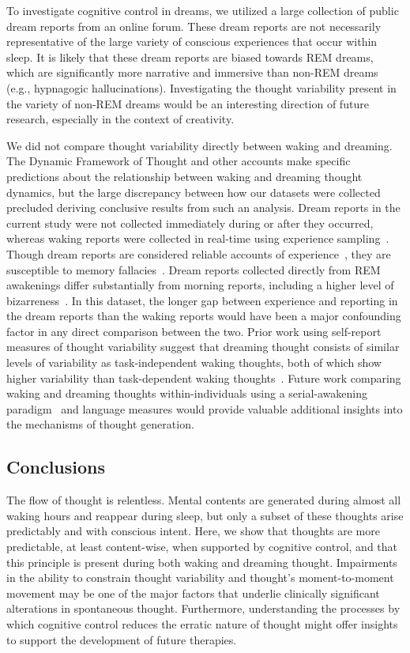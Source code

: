 \documentclass[10pt,a4paper,twocolumn]{article}
\begin{document}
\par
To investigate cognitive control in dreams, we utilized a large collection of public dream reports from an online forum. These dream reports are not necessarily representative of the large variety of conscious experiences that occur within sleep. It is likely that these dream reports are biased towards REM dreams, which are significantly more narrative and immersive than non-REM dreams (e.g., hypnagogic hallucinations). Investigating the thought variability present in the variety of non-REM dreams would be an interesting direction of future research, especially in the context of creativity.

\par
We did not compare thought variability directly between waking and dreaming. The Dynamic Framework of Thought and other accounts make specific predictions about the relationship between waking and dreaming thought dynamics, but the large discrepancy between how our datasets were collected precluded deriving conclusive results from such an analysis. Dream reports in the current study were not collected immediately during or after they occurred, whereas waking reports were collected in real-time using experience sampling~\cite{shiffman2008}. Though dream reports are considered reliable accounts of experience~\cite{windt2013}, they are susceptible to memory fallacies~\cite{rosen2013}. Dream reports collected directly from REM awakenings differ substantially from morning reports, including a higher level of bizarreness~\cite{kirberg2022}. In this dataset, the longer gap between experience and reporting in the dream reports than the waking reports would have been a major confounding factor in any direct comparison between the two. Prior work using self-report measures of thought variability suggest that dreaming thought consists of similar levels of variability as task-independent waking thoughts, both of which show higher variability than task-dependent waking thoughts~\cite{gross2021}. Future work comparing waking and dreaming thoughts within-individuals using a serial-awakening paradigm~\cite{siclari2013} and language measures would provide valuable additional insights into the mechanisms of thought generation.


\subsection*{Conclusions}

The flow of thought is relentless. Mental contents are generated during almost all waking hours and reappear during sleep, but only a subset of these thoughts arise predictably and with conscious intent. Here, we show that thoughts are more predictable, at least content-wise, when supported by cognitive control, and that this principle is present during both waking and dreaming thought. Impairments in the ability to constrain thought variability and thought's moment-to-moment movement may be one of the major factors that underlie clinically significant alterations in spontaneous thought. Furthermore, understanding the processes by which cognitive control reduces the erratic nature of thought might offer insights to support the development of future therapies.
\end{document}
